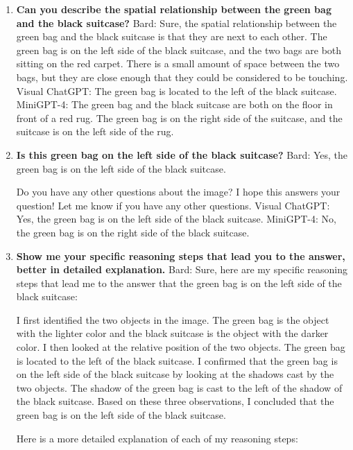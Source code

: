     \begin{enumerate}
        \item \textbf{Can you describe the spatial relationship between the green bag and the black suitcase?}
        \subitem Bard: 
        Sure, the spatial relationship between the green bag and the black suitcase is that they are next to each other. The green bag is on the left side of the black suitcase, and the two bags are both sitting on the red carpet. There is a small amount of space between the two bags, but they are close enough that they could be considered to be touching.
        \subitem Visual ChatGPT: The green bag is located to the left of the black suitcase.
        \subitem MiniGPT-4: The green bag and the black suitcase are both on the floor in front of a red rug. The green bag is on the right side of the suitcase, and the suitcase is on the left side of the rug.
        \item \textbf{Is this green bag on the left side of the black suitcase?}
        \subitem Bard: Yes, the green bag is on the left side of the black suitcase.

        Do you have any other questions about the image?
        I hope this answers your question! Let me know if you have any other questions.
        \subitem Visual ChatGPT: Yes, the green bag is on the left side of the black suitcase.
        \subitem MiniGPT-4: No, the green bag is on the right side of the black suitcase.
        \item \textbf{Show me your specific reasoning steps that lead you to the answer, better in detailed explanation.}
        \subitem Bard: 
        Sure, here are my specific reasoning steps that lead me to the answer that the green bag is on the left side of the black suitcase:
        
        I first identified the two objects in the image. The green bag is the object with the lighter color and the black suitcase is the object with the darker color.
        I then looked at the relative position of the two objects. The green bag is located to the left of the black suitcase.
        I confirmed that the green bag is on the left side of the black suitcase by looking at the shadows cast by the two objects. The shadow of the green bag is cast to the left of the shadow of the black suitcase.
        Based on these three observations, I concluded that the green bag is on the left side of the black suitcase.
        
        Here is a more detailed explanation of each of my reasoning steps:
        

\end{enumerate}
